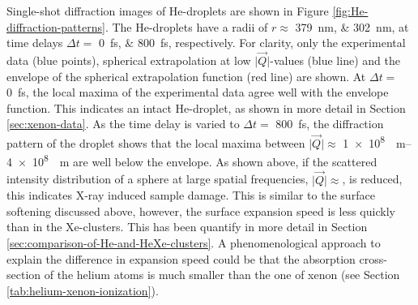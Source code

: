 Single-shot diffraction images of He-droplets are shown in Figure \ref{fig:He-diffraction-patterns}. The He-droplets have a radii of $r\approx$ \SIlist{379;302}{\nano\meter}, at time delays $\Delta t=$ \SIlist{0;800}{\femto\second}, respectively. For clarity, only the experimental data (blue points), spherical extrapolation at low $\lvert\vec{Q}\rvert$-values (blue line) and the envelope of the spherical extrapolation function (red line) are shown. At $\Delta t =$ \SI{0}{\femto\second}, the local maxima of the experimental data agree well with the envelope function. This indicates an intact He-droplet, as shown in more detail in Section \ref{sec:xenon-data}. As the time delay is varied to $\Delta t=$ \SI{800}{\femto\second}, the diffraction pattern of the droplet shows that the local maxima between $\lvert\vec{Q}\rvert \approx$ \SIrange[scientific-notation=fixed, fixed-exponent=8]{1e8}{4e8}{\per\meter} are well below the envelope. As shown above, if the scattered intensity distribution of a sphere at large spatial frequencies, $\lvert\vec{Q}\rvert \approx$, is reduced, this indicates X-ray induced sample damage. This is similar to the surface softening discussed above, however, the surface expansion speed is less quickly than in the Xe-clusters. This has been quantify in more detail in Section \ref{sec:comparison-of-He-and-HeXe-clusters}. A phenomenological approach to explain the difference in expansion speed could be that the absorption cross-section of the helium atoms is much smaller than the one of xenon (see Section \ref{tab:helium-xenon-ionization}).
%
%
%
%
